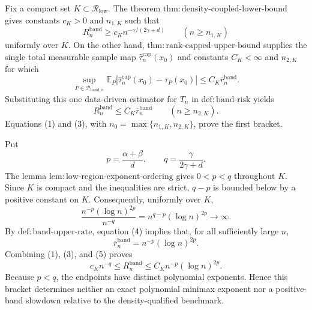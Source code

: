 Fix a compact set \(K\subset\mathcal R_{\mathrm{low}}\).  The theorem
\(\mathrm{thm:density\mbox{-}coupled\mbox{-}lower\mbox{-}bound}\) gives
constants \(c_K>0\) and \(n_{1,K}\) such that
\[
R_n^{\mathrm{band}}\geq c_K n^{-\gamma/(2\gamma+d)}
\qquad(n\geq n_{1,K})
\tag{1}
\]
uniformly over \(K\).  On the other hand,
\(\mathrm{thm:rank\mbox{-}capped\mbox{-}upper\mbox{-}bound}\) supplies the
single total measurable sample map
\(\widehat\tau_n^{\mathrm{cap}}(x_0)\) and constants \(C_K<\infty\) and
\(n_{2,K}\) for which
\[
\sup_{P\in\mathcal P_{\mathrm{band},n}}
\mathbb E_P\left|
\widehat\tau_n^{\mathrm{cap}}(x_0)-\tau_P(x_0)
\right|
\leq C_K\overline r_n^{\mathrm{band}}.
\tag{2}
\]
Substituting this one data-driven estimator for \(T_n\) in
\(\mathrm{def:band\mbox{-}risk}\) yields
\[
R_n^{\mathrm{band}}\leq C_K\overline r_n^{\mathrm{band}}
\qquad(n\geq n_{2,K}).
\tag{3}
\]
Equations (1) and (3), with
\(n_0=\max\{n_{1,K},n_{2,K}\}\), prove the first bracket.

Put
\[
p=\frac{\alpha+\beta}{d},
\qquad
q=\frac{\gamma}{2\gamma+d}.
\]
The lemma
\(\mathrm{lem:low\mbox{-}region\mbox{-}exponent\mbox{-}ordering}\) gives
\(0<p<q\) throughout \(K\).  Since \(K\) is compact and the inequalities
are strict, \(q-p\) is bounded below by a positive constant on \(K\).
Consequently, uniformly over \(K\),
\[
\frac{n^{-p}(\log n)^{2p}}{n^{-q}}
=n^{q-p}(\log n)^{2p}\longrightarrow\infty.
\tag{4}
\]
By \(\mathrm{def:band\mbox{-}upper\mbox{-}rate}\), equation (4) implies
that, for all sufficiently large \(n\),
\[
\overline r_n^{\mathrm{band}}
=n^{-p}(\log n)^{2p}.
\tag{5}
\]
Combining (1), (3), and (5) proves
\[
c_Kn^{-q}\leq R_n^{\mathrm{band}}
\leq C_Kn^{-p}(\log n)^{2p}.
\]
Because \(p<q\), the endpoints have distinct polynomial exponents.  Hence
this bracket determines neither an exact polynomial minimax exponent nor a
positive-band slowdown relative to the density-qualified benchmark.